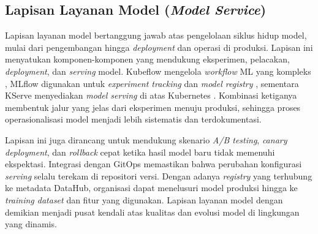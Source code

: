 \subsection{Lapisan Layanan Model (\textit{Model Service})}

Lapisan layanan model bertanggung jawab atas pengelolaan siklus hidup model, mulai dari pengembangan hingga \textit{deployment} dan operasi di produksi. Lapisan ini menyatukan komponen-komponen yang mendukung eksperimen, pelacakan, \textit{deployment}, dan \textit{serving} model. Kubeflow mengelola \textit{workflow} ML yang kompleks \autocite{kubeflow2024}, MLflow digunakan untuk \textit{experiment tracking} dan \textit{model registry} \autocite{mlflow2024}, sementara KServe menyediakan \textit{model serving} di atas Kubernetes \autocite{kserve2024,shankar2022operationalizing}. Kombinasi ketiganya membentuk jalur yang jelas dari eksperimen menuju produksi, sehingga proses operasionalisasi model menjadi lebih sistematis dan terdokumentasi.

Lapisan ini juga dirancang untuk mendukung skenario \textit{A/B testing}, \textit{canary deployment}, dan \textit{rollback} cepat ketika hasil model baru tidak memenuhi ekspektasi. Integrasi dengan GitOps memastikan bahwa perubahan konfigurasi \textit{serving} selalu terekam di repositori versi. Dengan adanya \textit{registry} yang terhubung ke metadata DataHub, organisasi dapat menelusuri model produksi hingga ke \textit{training dataset} dan fitur yang digunakan. Lapisan layanan model dengan demikian menjadi pusat kendali atas kualitas dan evolusi model di lingkungan yang dinamis.

